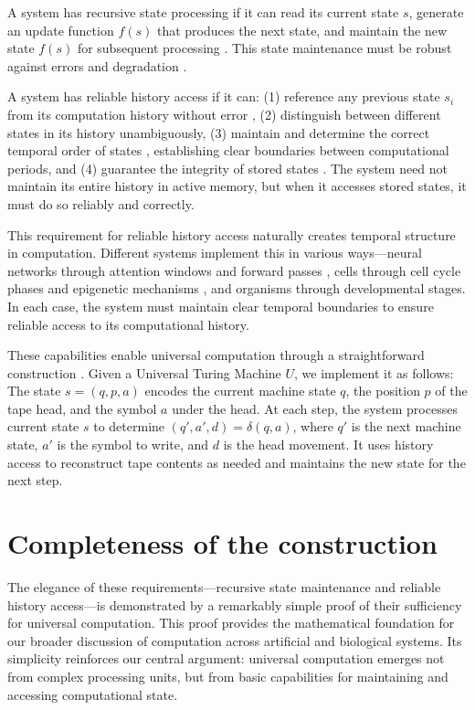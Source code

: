 \documentclass[12pt]{article}
\begin{document}
A system has recursive state processing if it can read its current state $s$, generate an update function $f(s)$ that produces the next state, and maintain the new state $f(s)$ for subsequent processing \cite{manuri2019state}.
This state maintenance must be robust against errors and degradation \cite{yang2013survey}.

A system has reliable history access if it can: (1) reference any previous state $s_i$ from its computation history without error \cite{fu2024memory}, (2) distinguish between different states in its history unambiguously, (3) maintain and determine the correct temporal order of states \cite{berridge2014cell,pastor2020computation}, establishing clear boundaries between computational periods, and (4) guarantee the integrity of stored states \cite{lovkvist2021using}.
The system need not maintain its entire history in active memory, but when it accesses stored states, it must do so reliably and correctly.

This requirement for reliable history access naturally creates temporal structure in computation.
Different systems implement this in various ways---neural networks through attention windows and forward passes \cite{martini2015information,quentin2019differential}, cells through cell cycle phases and epigenetic mechanisms \cite{bruno2022epigenetic}, and organisms through developmental stages.
In each case, the system must maintain clear temporal boundaries to ensure reliable access to its computational history.

These capabilities enable universal computation through a straightforward construction \cite{deutsch1995universality,bennett1989time}.
Given a Universal Turing Machine $U$, we implement it as follows: The state $s = (q, p, a)$ encodes the current machine state $q$, the position $p$ of the tape head, and the symbol $a$ under the head.
At each step, the system processes current state $s$ to determine $(q', a', d) = \delta(q, a)$, where $q'$ is the next machine state, $a'$ is the symbol to write, and $d$ is the head movement.
It uses history access to reconstruct tape contents as needed and maintains the new state for the next step.

\section{Completeness of the construction}

The elegance of these requirements---recursive state maintenance and reliable history access---is demonstrated by a remarkably simple proof of their sufficiency for universal computation.
This proof provides the mathematical foundation for our broader discussion of computation across artificial and biological systems.
Its simplicity reinforces our central argument: universal computation emerges not from complex processing units, but from basic capabilities for maintaining and accessing computational state.
\end{document}
